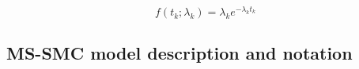\documentclass[11pt]{article}
\begin{document}
\begin{equation}
	f(t_k; \lambda_k) = \lambda_k e^{-\lambda_k t_k}
\end{equation}







\subsection{MS-SMC model description and notation}
\end{document}
